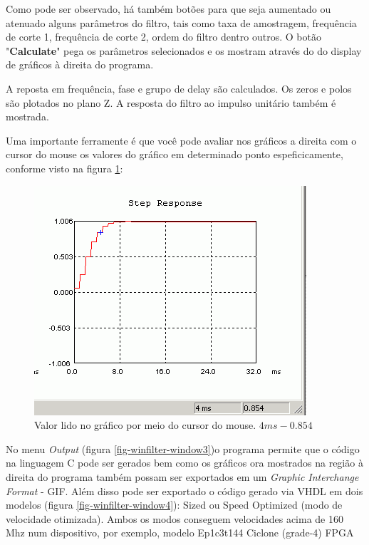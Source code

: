 		Como pode ser observado, há também botões para que seja aumentado ou atenuado alguns parâmetros do filtro, tais como taxa de amostragem, frequência de corte 1, frequência de corte 2, ordem do filtro dentro outros. O botão "\textbf{Calculate}" pega os parâmetros selecionados e os mostram através do do display de gráficos à direita do programa.
		
		A reposta em frequência, fase e grupo de delay são calculados. Os zeros e polos são plotados no plano Z. A resposta do filtro ao impulso unitário também é mostrada. 
		
		Uma importante ferramente é que você pode avaliar nos gráficos a direita com o cursor do mouse os valores do gráfico em determinado ponto espeficicamente, conforme visto na figura \ref{fig-winfilter-window2}:
		
		\begin{figure}[!ht]
			\label{fig-winfilter-window2}
			\centering
			\includegraphics[scale=1]{./figuras/cursor.png}
			\caption{Valor lido no gráfico por meio do cursor do mouse. $ 4ms - 0.854 $}
		\end{figure}
	\newpage
		No menu \textit{Output} (figura \ref{fig-winfilter-window3})o programa permite que o código na linguagem C pode ser gerados bem como os gráficos ora mostrados na região à direita do programa também possam ser exportados em um \textit{Graphic Interchange Format} - GIF. Além disso pode ser exportado o código gerado via VHDL em dois modelos (figura \ref{fig-winfilter-window4}): Sized ou Speed Optimized (modo de velocidade otimizada). Ambos os modos conseguem velocidades acima de 160 Mhz num dispositivo, por exemplo, modelo Ep1c3t144 Ciclone (grade-4) FPGA
		
